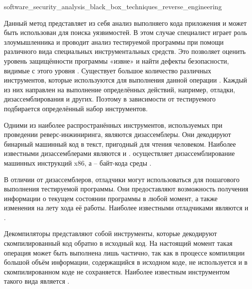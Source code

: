 
	{software_security_analysis_black_box_techniques_reverse_engineering}

%
Данный метод представляет из себя анализ выполняего кода приложения и может быть использован для поиска уязвимостей. 
%
В этом случае специалист играет роль злоумышленника и проводит анализ тестируемой программы при помощи различного вида специальных инструментальных средств. 
%
Это позволяет оценить уровень защищённости программы «извне» и найти дефекты безопасности, видимые с этого уровня . 
%
Существует большое количество различных инструментов, которые используются для выполнения данной операции . 
%
Каждый из них направлен на выполнение определённых действий, например, отладки, дизассемблирования и других. 
%
Поэтому в зависимости от тестируемого  подбирается определённый набор инструментов.

%
Одними из наиболее распространённых инструментов, используемых при проведении реверс-инжиниринга, являются дизассемблеры. 
%
Они декодируют бинарный машинный код в текст, пригодный для чтения человеком. 
%
Наиболее известными дизассемблерами являются   и  . 
%
 осуществляет дизассемблирование машинных инструкций x86, а  -- байт-кода среды  .

%
В отличии от дизассемблеров, отладчики могут использоваться для пошагового выполнения тестируемой программы. 
%
Они предоставляют возможность получения информации о текущем состоянии программы в любой момент, а также изменения на лету хода её работы. Наиболее известными отладчиками являются   и  .

%
Декомпиляторы представляют собой инструменты, которые декодируют скомпилированный код обратно в исходный код. 
%
На настоящий момент такая операция может быть выполнена лишь частично, так как в процессе компиляции большой объём информации, содержащийся в исходном коде, не используется и в скомпилированном коде не сохраняется. 
%
Наиболее известным инструментом такого вида является  .

